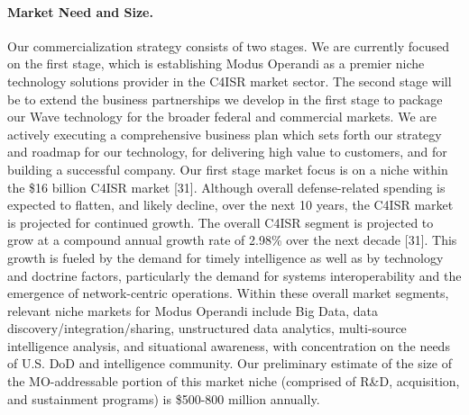 \documentclass{sbir}
\begin{document}
\paragraph{Market Need and Size.} Our commercialization strategy consists of two stages. We are currently focused on the first stage, which is establishing Modus Operandi as a premier niche technology solutions provider in the C4ISR market sector. The second stage will be to extend the business partnerships we develop in the first stage to package our Wave technology for the broader federal and commercial markets.
We are actively executing a comprehensive business plan which sets forth our strategy and roadmap for our technology, for delivering high value to customers, and for building a successful company. Our first stage market focus is on a niche within the \$16 billion C4ISR market [31]. Although overall defense-related spending is expected to flatten, and likely decline, over the next 10 years, the C4ISR market is projected for continued growth. The overall C4ISR segment is projected to grow at a compound annual growth rate of 2.98\% over the next decade [31]. This growth is fueled by the demand for timely intelligence as well as by technology and doctrine factors, particularly the demand for systems interoperability and the emergence of network-centric operations.
Within these overall market segments, relevant niche markets for Modus Operandi include Big Data, data discovery/integration/sharing, unstructured data analytics, multi-source intelligence analysis, and situational awareness, with concentration on the needs of U.S. DoD and intelligence community. Our preliminary estimate of the size of the MO-addressable portion of this market niche (comprised of R\&D, acquisition, and sustainment programs) is \$500-800 million annually.
\end{document}
